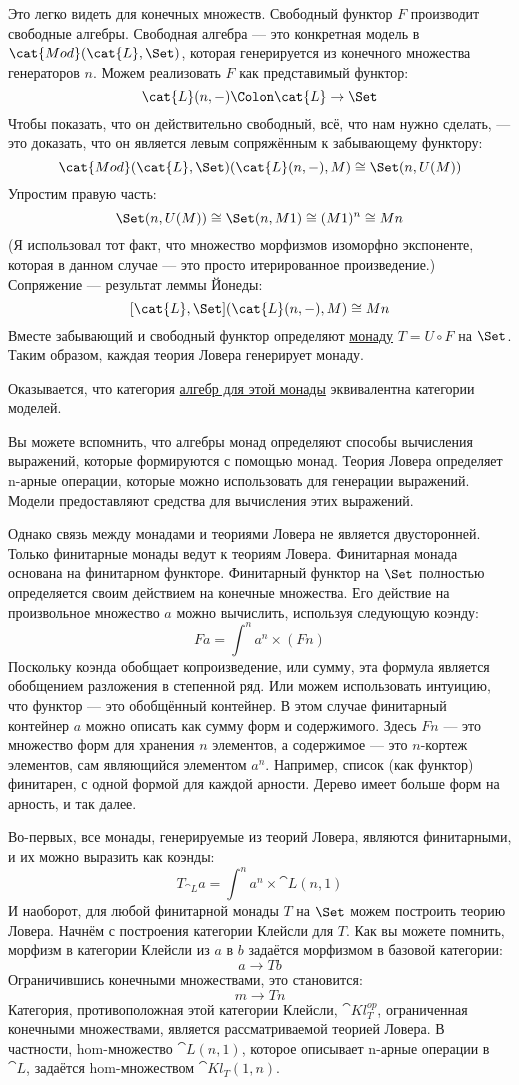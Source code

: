 Это легко видеть для конечных множеств. Свободный функтор $F$
производит свободные алгебры. Свободная алгебра — это конкретная модель в
$\cat{Mod}(\cat{L}, \Set)$, которая генерируется из конечного множества генераторов
$n$. Можем реализовать $F$ как представимый функтор:
\[\cat{L}(n, -) \Colon \cat{L} \to \Set\]
Чтобы показать, что он действительно свободный, всё, что нам нужно сделать, — это доказать, что он является
левым сопряжённым к забывающему функтору:
\[\cat{Mod}(\cat{L}, \Set)(\cat{L}(n, -), M) \cong \Set(n, U(M))\]
Упростим правую часть:
\[\Set(n, U(M)) \cong \Set(n, M 1) \cong (M 1)^n \cong M n\]
(Я использовал тот факт, что множество морфизмов изоморфно
экспоненте, которая в данном случае — это просто итерированное произведение.) Сопряжение — результат леммы Йонеды:
\[[\cat{L}, \Set](\cat{L}(n, -), M) \cong M n\]
Вместе забывающий и свободный функтор определяют
\hyperref[monads-categorically]{монаду}
$T = U \circ F$ на $\Set$. Таким образом, каждая теория Ловера генерирует
монаду.

Оказывается, что категория
\hyperref[algebras-for-monads]{алгебр
  для этой монады} эквивалентна категории моделей.

Вы можете вспомнить, что алгебры монад определяют способы вычисления выражений,
которые формируются с помощью монад. Теория Ловера определяет n-арные операции,
которые можно использовать для генерации выражений. Модели предоставляют средства для
вычисления этих выражений.

Однако связь между монадами и теориями Ловера не является двусторонней.
Только финитарные монады ведут к теориям Ловера. Финитарная монада
основана на финитарном функторе. Финитарный функтор на $\Set$
полностью определяется своим действием на конечные множества. Его действие на
произвольное множество $a$ можно вычислить, используя следующую коэнду:
\[F a = \int^n a^n \times (F n)\]
Поскольку коэнда обобщает копроизведение, или сумму, эта формула является
обобщением разложения в степенной ряд. Или можем использовать интуицию,
что функтор — это обобщённый контейнер. В этом случае финитарный
контейнер $a$ можно описать как сумму форм и
содержимого. Здесь $F n$ — это множество форм для хранения $n$ элементов,
а содержимое — это $n$-кортеж элементов, сам являющийся элементом
$a^n$. Например, список (как функтор) финитарен, с одной
формой для каждой арности. Дерево имеет больше форм на арность, и так далее.

Во-первых, все монады, генерируемые из теорий Ловера, являются
финитарными, и их можно выразить как коэнды:
\[T_{\cat{L}} a = \int^n a^n \times \cat{L}(n, 1)\]
И наоборот, для любой финитарной монады $T$ на $\Set$ можем
построить теорию Ловера. Начнём с построения категории Клейсли
для $T$. Как вы можете помнить, морфизм в категории Клейсли
из $a$ в $b$ задаётся морфизмом в базовой
категории:
\[a \to T b\]
Ограничившись конечными множествами, это становится:
\[m \to T n\]
Категория, противоположная этой категории Клейсли,
$\cat{Kl}^\mathit{op}_{T}$, ограниченная конечными
множествами, является рассматриваемой теорией Ловера. В частности, hom-множество
$\cat{L}(n, 1)$, которое описывает n-арные операции в $\cat{L}$, задаётся
hom-множеством $\cat{Kl}_{T}(1, n)$.

